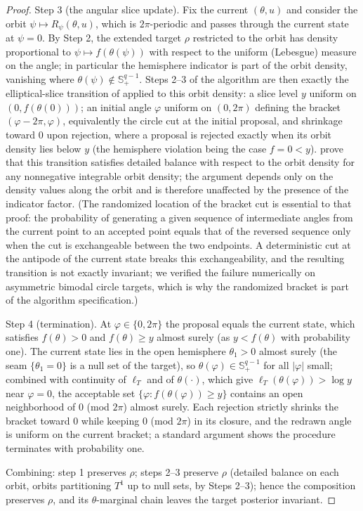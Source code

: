 \documentclass[11pt]{article}
\theoremstyle{definition}
\theoremstyle{plain}
\begin{document}
\begin{proof}
Step 3 (the angular slice update). Fix the current $(\theta,u)$ and consider the orbit $\psi\mapsto R_\psi(\theta,u)$, which is $2\pi$-periodic and passes through the current state at $\psi=0$. By Step 2, the extended target $\rho$ restricted to the orbit has density proportional to $\psi\mapsto f(\theta(\psi))$ with respect to the uniform (Lebesgue) measure on the angle; in particular the hemisphere indicator is part of the orbit density, vanishing where $\theta(\psi)\notin\mathbb S^{q-1}_+$. Steps 2--3 of the algorithm are then exactly the elliptical-slice transition of \citet[Section 2.3]{Murray2010} applied to this orbit density: a slice level $y$ uniform on $(0,f(\theta(0)))$; an initial angle $\varphi$ uniform on $(0,2\pi)$ defining the bracket $(\varphi-2\pi,\varphi)$, equivalently the circle cut at the initial proposal, and shrinkage toward $0$ upon rejection, where a proposal is rejected exactly when its orbit density lies below $y$ (the hemisphere violation being the case $f=0<y$). \citet{Murray2010} prove that this transition satisfies detailed balance with respect to the orbit density for any nonnegative integrable orbit density; the argument depends only on the density values along the orbit and is therefore unaffected by the presence of the indicator factor. (The randomized location of the bracket cut is essential to that proof: the probability of generating a given sequence of intermediate angles from the current point to an accepted point equals that of the reversed sequence only when the cut is exchangeable between the two endpoints. A deterministic cut at the antipode of the current state breaks this exchangeability, and the resulting transition is not exactly invariant; we verified the failure numerically on asymmetric bimodal circle targets, which is why the randomized bracket is part of the algorithm specification.)

Step 4 (termination). At $\varphi\in\{0,2\pi\}$ the proposal equals the current state, which satisfies $f(\theta)>0$ and $f(\theta)\ge y$ almost surely (as $y<f(\theta)$ with probability one). The current state lies in the open hemisphere $\theta_1>0$ almost surely (the seam $\{\theta_1=0\}$ is a null set of the target), so $\theta(\varphi)\in\mathbb S^{q-1}_+$ for all $|\varphi|$ small; combined with continuity of $\ell_T$ and of $\theta(\cdot)$, which give $\ell_T(\theta(\varphi))>\log y$ near $\varphi=0$, the acceptable set $\{\varphi:f(\theta(\varphi))\ge y\}$ contains an open neighborhood of $0$ (mod $2\pi$) almost surely. Each rejection strictly shrinks the bracket toward $0$ while keeping $0$ (mod $2\pi$) in its closure, and the redrawn angle is uniform on the current bracket; a standard argument \citep[Section 4.1]{Neal2003} shows the procedure terminates with probability one.

Combining: step 1 preserves $\rho$; steps 2--3 preserve $\rho$ (detailed balance on each orbit, orbits partitioning $T^1$ up to null sets, by Steps 2--3); hence the composition preserves $\rho$, and its $\theta$-marginal chain leaves the target posterior invariant.
\end{proof}
\end{document}
